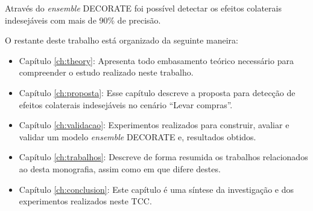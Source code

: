 Através do \textit{ensemble} DECORATE foi possível detectar os efeitos colaterais indesejáveis com mais de 90\% de precisão. 

O restante deste trabalho está organizado da seguinte maneira:

\begin{itemize}
\item Capítulo \ref{ch:theory}: Apresenta todo embasamento teórico necessário para compreender o estudo realizado neste trabalho.
\item Capítulo \ref{ch:proposta}: Esse capítulo descreve a proposta para detecção de efeitos colaterais indesejáveis no cenário ``Levar compras''.
\item Capítulo \ref{ch:validacao}: Experimentos realizados para construir, avaliar e validar um modelo \textit{ensemble} DECORATE e, resultados obtidos.
\item Capítulo \ref{ch:trabalhos}: Descreve de forma resumida os trabalhos relacionados ao desta monografia, assim como em que difere destes.
\item Capítulo \ref{ch:conclusion}: Este capítulo é uma síntese da investigação e dos experimentos realizados neste TCC.
\end{itemize}
